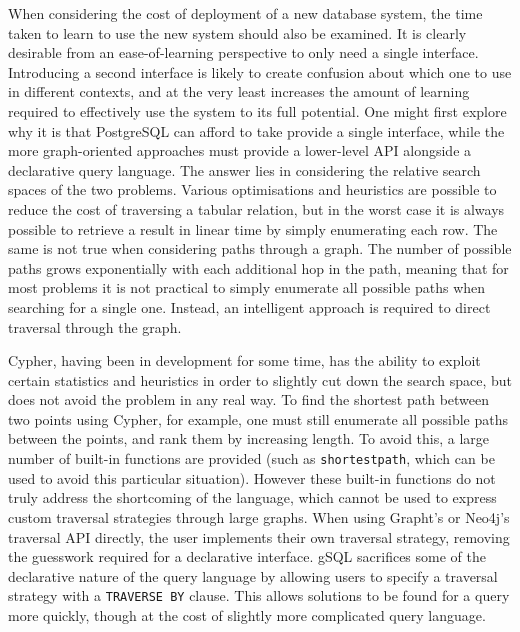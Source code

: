 When considering the cost of deployment of a new database system, the time
taken to learn to use the new system should also be examined. It is clearly
desirable from an ease-of-learning perspective to only need a single
interface. Introducing a second interface is likely to create confusion about
which one to use in different contexts, and at the very least increases the
amount of learning required to effectively use the system to its full
potential. One might first explore why it is that PostgreSQL can afford to
take provide a single interface, while the more graph-oriented approaches must
provide a lower-level API alongside a declarative query language. The answer
lies in considering the relative search spaces of the two problems. Various
optimisations and heuristics are possible to reduce the cost of traversing a
tabular relation, but in the worst case it is always possible to retrieve a
result in linear time by simply enumerating each row. The same is not true
when considering paths through a graph. The number of possible paths grows
exponentially with each additional hop in the path, meaning that for most
problems it is not practical to simply enumerate all possible paths when
searching for a single one. Instead, an intelligent approach is required to
direct traversal through the graph.

Cypher, having been in development for some time, has the ability to exploit
certain statistics and heuristics in order to slightly cut down the search
space, but does not avoid the problem in any real way. To find the shortest
path between two points using Cypher, for example, one must still enumerate all
possible paths between the points, and rank them by increasing length. To
avoid this, a large number of built-in functions are provided (such as
\texttt{shortestpath}, which can be used to avoid this particular situation). However these built-in
functions do not truly address the shortcoming of the language, which cannot
be used to express custom traversal strategies through large graphs. 
When using Grapht's or Neo4j's traversal API directly, the user
implements their own traversal strategy, removing the guesswork required for a
declarative interface. gSQL sacrifices some of the declarative nature of the
query language by allowing users to specify a traversal strategy with a
\texttt{TRAVERSE BY} clause. This allows solutions to be found for a query
more quickly, though at the cost of slightly more complicated query language.


